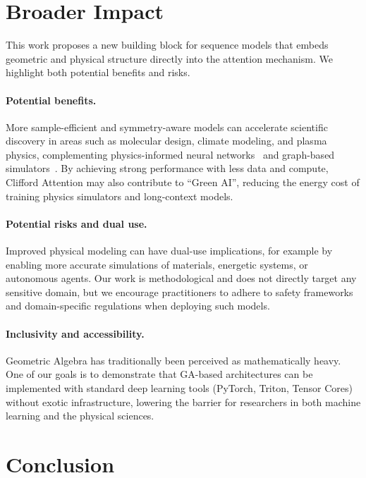 \documentclass{article}
\theoremstyle{plain}
\theoremstyle{definition}
\theoremstyle{remark}
\begin{document}
\section{Broader Impact}
\label{sec:impact}

This work proposes a new building block for sequence models that embeds geometric and physical structure directly into the attention mechanism. We highlight both potential benefits and risks.

\paragraph{Potential benefits.}
More sample-efficient and symmetry-aware models can accelerate scientific discovery in areas such as molecular design, climate modeling, and plasma physics, complementing physics-informed neural networks~\cite{raissi2019physics} and graph-based simulators~\cite{sanchez2020learning}. By achieving strong performance with less data and compute, Clifford Attention may also contribute to ``Green AI'', reducing the energy cost of training physics simulators and long-context models.

\paragraph{Potential risks and dual use.}
Improved physical modeling can have dual-use implications, for example by enabling more accurate simulations of materials, energetic systems, or autonomous agents. Our work is methodological and does not directly target any sensitive domain, but we encourage practitioners to adhere to safety frameworks and domain-specific regulations when deploying such models.

\paragraph{Inclusivity and accessibility.}
Geometric Algebra has traditionally been perceived as mathematically heavy. One of our goals is to demonstrate that GA-based architectures can be implemented with standard deep learning tools (PyTorch, Triton, Tensor Cores) without exotic infrastructure, lowering the barrier for researchers in both machine learning and the physical sciences.

\section{Conclusion}
\end{document}
